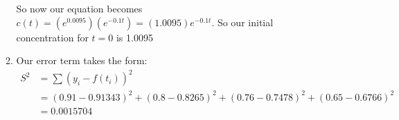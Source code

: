 \documentclass{article}
\begin{document}
\begin{enumerate}
\begin{enumerate}
            So now our equation becomes $c(t) = (e^{0.0095})(e^{-0.1t}) = (1.0095)e^{-0.1t}$. So our initial concentration for $t=0$ is 1.0095
            \item
            Our error term takes the form:
            \begin{align*}
                S^2 &= \sum(y_i-f(t_i))^2 \\
                &= (0.91-0.91343)^2 + (0.8-0.8265)^2 + (0.76-0.7478)^2 + (0.65-0.6766)^2 \\
                &= 0.0015704
            \end{align*}
        \end{enumerate}
\end{enumerate}
\end{document}
